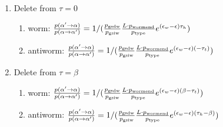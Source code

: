 \documentclass[12pt, two sided]{article}
\begin{document}
\begin{enumerate}
		\item Delete from $\tau=0$
		\begin{enumerate}
		\item{worm: $\frac{p(\alpha^\prime\to\alpha)}{p(\alpha\to\alpha^\prime)} = 1/(\frac{p_{\rm{gsdw}}}{p_{\rm{gsiw}}} \frac{L \cdot p_{\rm{wormend}}}{p_{\rm{type}}} e^{(\epsilon_w-\epsilon)\tau_h})$ }
		\item{antiworm: $\frac{p(\alpha^\prime\to\alpha)}{p(\alpha\to\alpha^\prime)}=1/(\frac{p_{\rm{gsdw}}}{p_{\rm{gsiw}}} \frac{L \cdot p_{\rm{wormend}}}{p_{\rm{type}}} e^{(\epsilon_w-\epsilon)(-\tau_t)})$}
		\end{enumerate}
		\item Delete from $\tau=\beta$ 
		\begin{enumerate}
		\item{worm: $\frac{p(\alpha^\prime\to\alpha)}{p(\alpha\to\alpha^\prime)} = 1/(\frac{p_{\rm{gsdw}}}{p_{\rm{gsiw}}} \frac{L \cdot p_{\rm{wormend}}}{p_{\rm{type}}} e^{(\epsilon_w-\epsilon)(\beta-\tau_t)})$}
		\item{antiworm: $\frac{p(\alpha^\prime\to\alpha)}{p(\alpha\to\alpha^\prime)} = 1/(\frac{p_{\rm{gsdw}}}{p_{\rm{gsiw}}} \frac{L \cdot p_{\rm{wormend}}}{p_{\rm{type}}} e^{(\epsilon_w-\epsilon)(\tau_h-\beta)})$}
		\end{enumerate}
	\end{enumerate}
	
\end{document}
